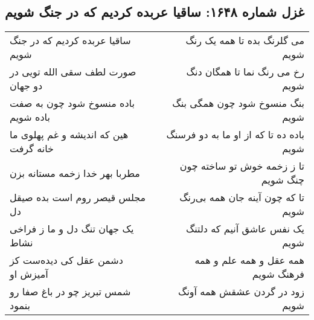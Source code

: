\begin{center}
\section*{غزل شماره ۱۶۴۸: ساقیا عربده کردیم که در جنگ شویم}
\label{sec:1648}
\begin{longtable}{l p{0.5cm} r}
ساقیا عربده کردیم که در جنگ شویم
&&
می گلرنگ بده تا همه یک رنگ شویم
\\
صورت لطف سقی الله تویی در دو جهان
&&
رخ می رنگ نما تا همگان دنگ شویم
\\
باده منسوخ شود چون به صفت باده شویم
&&
بنگ منسوخ شود چون همگی بنگ شویم
\\
هین که اندیشه و غم پهلوی ما خانه گرفت
&&
باده ده تا که از او ما به دو فرسنگ شویم
\\
مطربا بهر خدا زخمه مستانه بزن
&&
تا ز زخمه خوش تو ساخته چون چنگ شویم
\\
مجلس قیصر روم است بده صیقل دل
&&
تا که چون آینه جان همه بی‌رنگ شویم
\\
یک جهان تنگ دل و ما ز فراخی نشاط
&&
یک نفس عاشق آنیم که دلتنگ شویم
\\
دشمن عقل کی دیده‌ست کز آمیزش او
&&
همه عقل و همه علم و همه فرهنگ شویم
\\
شمس تبریز چو در باغ صفا رو بنمود
&&
زود در گردن عشقش همه آونگ شویم
\\
\end{longtable}
\end{center}
